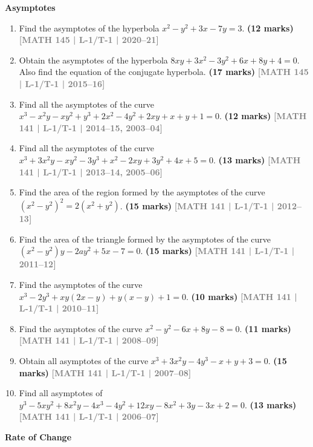 \documentclass[12pt,a3paper]{article}
\newcommand{\yr}[1]{\hfill\textcolor{gray}{\small\textbf{[#1]}}}
\newcommand{\mk}[1]{\textcolor{orange!70!black}{\small\textbf{(#1 marks)}}}
\newcommand{\subtopic}[2]{%
  \vspace{10pt}
  \noindent\begin{tcolorbox}[colback=#1!8,colframe=#1,boxrule=0.6pt,arc=4pt,
    left=6pt,right=6pt,top=4pt,bottom=4pt]
    \small\bfseries\textcolor{#1}{#2}
  \end{tcolorbox}
  \vspace{2pt}
}
\begin{document}
\subtopic{cA}{Asymptotes}
\label{sub:s1-asymptotes}

\begin{enumerate}
    
\item Find the asymptotes of the hyperbola $x^{2}-y^{2}+3x-7y=3$.
\mk{12} \yr{MATH 145 | L-1/T-1 | 2020--21}

\item Obtain the asymptotes of the hyperbola $8xy+3x^{2}-3y^{2}+6x+8y+4=0$. Also find the equation of the conjugate hyperbola.
\mk{17} \yr{MATH 145 | L-1/T-1 | 2015--16}

\item Find all the asymptotes of the curve $x^{3}-x^{2}y-xy^{2}+y^{3}+2x^{2}-4y^{2}+2xy+x+y+1=0$.
\mk{12} \yr{MATH 141 | L-1/T-1 | 2014--15, 2003--04}

\item Find all the asymptotes of the curve $x^{3}+3x^{2}y-xy^{2}-3y^{3}+x^{2}-2xy+3y^{2}+4x+5=0$.
\mk{13} \yr{MATH 141 | L-1/T-1 | 2013--14, 2005--06}

\item Find the area of the region formed by the asymptotes of the curve $(x^{2}-y^{2})^{2}=2(x^{2}+y^{2})$.
\mk{15} \yr{MATH 141 | L-1/T-1 | 2012--13}

\item Find the area of the triangle formed by the asymptotes of the curve $(x^{2}-y^{2})y-2ay^{2}+5x-7=0$.
\mk{15} \yr{MATH 141 | L-1/T-1 | 2011--12}

\item Find the asymptotes of the curve $x^{3}-2y^{3}+xy(2x-y)+y(x-y)+1=0$.
\mk{10} \yr{MATH 141 | L-1/T-1 | 2010--11}

\item Find the asymptotes of the curve $x^{2}-y^{2}-6x+8y-8=0$.
\mk{11} \yr{MATH 141 | L-1/T-1 | 2008--09}

\item Obtain all asymptotes of the curve $x^{3}+3x^{2}y-4y^{3}-x+y+3=0$.
\mk{15} \yr{MATH 141 | L-1/T-1 | 2007--08}

\item Find all asymptotes of $y^{3}-5xy^{2}+8x^{2}y-4x^{3}-4y^{2}+12xy-8x^{2}+3y-3x+2=0$.
\mk{13} \yr{MATH 141 | L-1/T-1 | 2006--07}


\end{enumerate}

\subtopic{cA}{Rate of Change}
\label{sub:s1-rateofchange}
\end{document}
